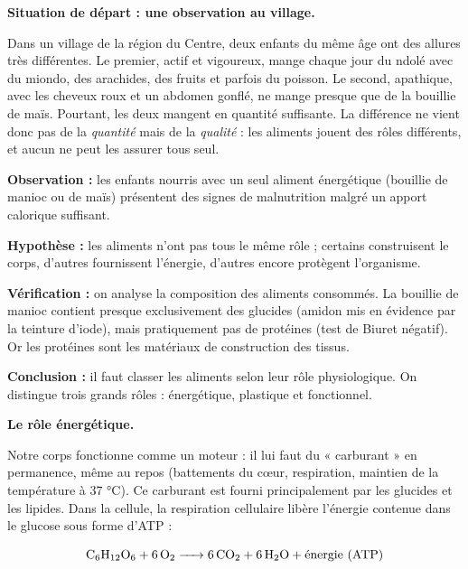 \documentclass[11pt]{article}
\newcommand{\cle}[1]{{\popxbold\color{popdark}#1}}
\newcounter{popsec}
\newcounter{popsub}
\newcommand{\courssub}[1]{%
  \stepcounter{popsub}%
  \par\vspace{9pt}\noindent{\popxbold\fontsize{11.5}{13}\selectfont\color{popink}{\color{poporange}\thepopsec.\thepopsub}\hspace{6pt}#1}\par\nopagebreak\vspace{4pt}
}
\begin{document}
\courssub{Les trois rôles des aliments}

\textbf{Situation de départ : une observation au village.}\par

Dans un village de la région du Centre, deux enfants du même âge ont des allures très différentes. Le premier, actif et vigoureux, mange chaque jour du ndolé avec du miondo, des arachides, des fruits et parfois du poisson. Le second, apathique, avec les cheveux roux et un abdomen gonflé, ne mange presque que de la bouillie de maïs. Pourtant, les deux mangent en quantité suffisante. La différence ne vient donc pas de la \emph{quantité} mais de la \emph{qualité} : les aliments jouent des rôles différents, et aucun ne peut les assurer tous seul.

\begin{experience}
\textbf{Observation :} les enfants nourris avec un seul aliment énergétique (bouillie de manioc ou de maïs) présentent des signes de malnutrition malgré un apport calorique suffisant.

\textbf{Hypothèse :} les aliments n'ont pas tous le même rôle ; certains construisent le corps, d'autres fournissent l'énergie, d'autres encore protègent l'organisme.

\textbf{Vérification :} on analyse la composition des aliments consommés. La bouillie de manioc contient presque exclusivement des glucides (amidon mis en évidence par la teinture d'iode), mais pratiquement pas de protéines (test de Biuret négatif). Or les protéines sont les matériaux de construction des tissus.

\textbf{Conclusion :} il faut classer les aliments selon leur rôle physiologique. On distingue trois grands rôles : \cle{énergétique}, \cle{plastique} et \cle{fonctionnel}.
\end{experience}

\textbf{Le rôle énergétique.}\par

Notre corps fonctionne comme un moteur : il lui faut du « carburant » en permanence, même au repos (battements du cœur, respiration, maintien de la température à 37 °C). Ce carburant est fourni principalement par les \cle{glucides} et les \cle{lipides}. Dans la cellule, la respiration cellulaire libère l'énergie contenue dans le glucose sous forme d'ATP :

\[ \ce{C6H12O6 + 6O2 -> 6CO2 + 6H2O + \text{énergie (ATP)}} \]
\end{document}
